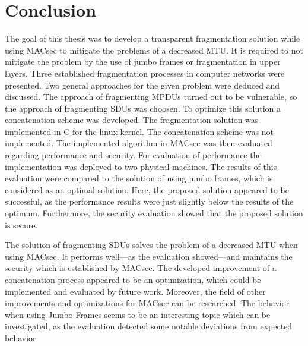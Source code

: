 \chapter{Conclusion}
The goal of this thesis was to develop a transparent fragmentation solution while using \gls{MACsec} to mitigate the problems of a decreased \gls{MTU}.
It is required to not mitigate the problem by the use of jumbo frames or fragmentation in upper layers.
Three established fragmentation processes in computer networks were presented.
Two general approaches for the given problem were deduced and discussed.
The approach of fragmenting \glspl{MPDU} turned out to be vulnerable, so the approach of fragmenting \glspl{SDU} was choosen.
To optimize this solution a concatenation scheme was developed.
The fragmentation solution was implemented in C for the linux kernel.
The concatenation scheme was not implemented.
The implemented algorithm in \gls{MACsec} was then evaluated regarding performance and security.
For evaluation of performance the implementation was deployed to two physical machines.
The results of this evaluation were compared to the solution of using jumbo frames, which is considered as an optimal solution.
Here, the proposed solution appeared to be successful, as the performance results were just slightly below the results of the optimum.
Furthermore, the security evaluation showed that the proposed solution is secure.

The solution of fragmenting \glspl{SDU} solves the problem of a decreased \gls{MTU} when using \gls{MACsec}.
It performs well---as the evaluation showed---and maintains the security which is established by \gls{MACsec}.
The developed improvement of a concatenation process appeared to be an optimization, which could be implemented and evaluated by future work.
Moreover, the field of other improvements and optimizations for \gls{MACsec} can be researched.
The behavior when using Jumbo Frames seems to be an interesting topic which can be investigated, as the evaluation detected some notable deviations from expected behavior.
